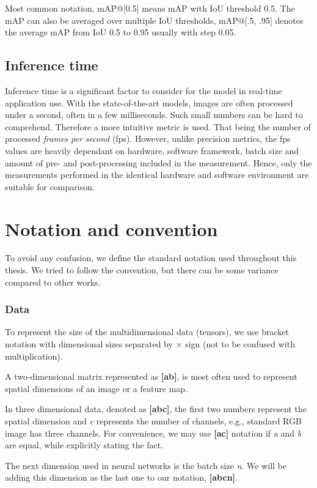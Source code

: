 Most common notation, mAP@[0.5] means mAP with IoU threshold 0.5. The mAP can also be averaged over multiple IoU thresholds, mAP@[.5, .95] denotes the average mAP from IoU 0.5 to 0.95 usually with step 0.05.

\subsection{Inference time}
Inference time is a significant factor to consider for the model in real-time application use. With the state-of-the-art models, images are often processed under a second, often in a few milliseconds. Such small numbers can be hard to comprehend. Therefore a more intuitive metric is used. That being the number of processed \textit{frames per second} (fps). However, unlike precision metrics, the fps values are heavily dependant on hardware, software framework, batch size and amount of pre- and post-processing included in the measurement. Hence, only the measurements performed in the identical hardware and software environment are suitable for comparison.

\section{Notation and convention}
\label{sec:notation}
To avoid any confusion, we define the standard notation used throughout this thesis. We tried to follow the convention, but there can be some variance compared to other works.

\subsubsection*{Data}

To represent the size of the multidimensional data (tensors), we use bracket notation with dimensional sizes separated by $\times $ sign (not to be confused with multiplication).

A two-dimensional matrix represented as \textbf{[a\x b]}, is most often used to represent spatial dimensions of an image or a feature map. 

In three dimensional data, denoted as \textbf{[a\x b\x c]}, the first two numbers represent the spatial dimension and \textit{c} represents the number of channels, e.g., standard RGB image has three channels. For convenience, we may use \textbf{[a\x c]} notation if \textit{a} and \textit{b} are equal, while explicitly stating the fact.

The next dimension used in neural networks is the batch size \textit{n}. We will be adding this dimension as the last one to our notation, \textbf{[a\x b\x c\x n]}.

